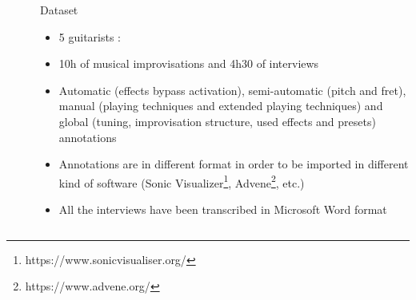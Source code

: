 \documentclass[final]{beamer}
\newlength{\sepwid}
\newlength{\onecolwid}
\begin{document}
\begin{frame}[t]
\begin{columns}[t]
\begin{column}{\onecolwid}
\end{column} %

\begin{column}{\sepwid}\end{column} %



\begin{column}{\onecolwid} %


\begin{block}{Dataset}


\begin{itemize}
    \item 5 guitarists : 
    \item 10h of musical improvisations and 4h30 of interviews
    \item Automatic (effects bypass activation), semi-automatic (pitch and fret), manual  (playing techniques and extended playing techniques) and global (tuning, improvisation structure, used effects and presets) annotations
    \item Annotations are in different format in order to be imported in different kind of software (Sonic Visualizer\footnote{https://www.sonicvisualiser.org/}, Advene\footnote{https://www.advene.org/}, etc.)
    \item All the interviews have been transcribed in Microsoft Word format
\end{itemize}



\end{block}
\end{column}
\end{columns}
\end{frame}
\end{document}

